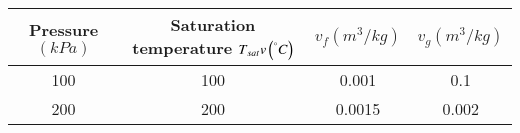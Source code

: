 \begin{tabular}{|c|c|c|c|}
\hline
     Pressure$(kPa)$ & Saturation temperature $T_{sat}v\left(^\degree C\right)$ 
     & $v_f(m^3 /kg)$ & $v_g (m^3 / kg)$ \\
     \hline 
     100 & 100 & 0.001 & 0.1 \\
     \hline
     200 & 200 & 0.0015 & 0.002 \\
     \hline
\end{tabular}
